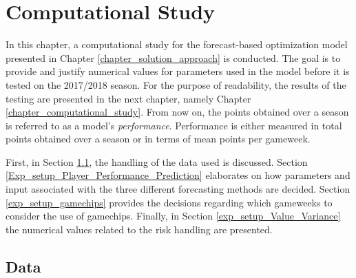 \chapter{Computational Study}\label{chapter_experimental_setup}


In this chapter, a computational study for the forecast-based optimization model presented in Chapter \ref{chapter_solution_approach} is conducted. The goal is to provide and justify numerical values for parameters used in the model before it is tested on the 2017/2018 season. For the purpose of readability, the results of the testing are presented in the next chapter, namely Chapter \ref{chapter_computational_study}. From now on, the points obtained over a season is referred to as a model's \textit{performance}. Performance is either measured in total points obtained over a season or in terms of mean points per gameweek.

\newpar

First, in Section \ref{exp_setup_data}, the handling of the data used is discussed. Section \ref{Exp_setup_Player_Performance_Prediction} elaborates on how parameters and input associated with the three different forecasting methods are decided. Section \ref{exp_setup_gamechips} provides the decisions regarding which gameweeks to consider the use of gamechips. Finally, in Section \ref{exp_setup_Value_Variance} the numerical values related to the risk handling are presented.

\section{Data} \label{exp_setup_data}


